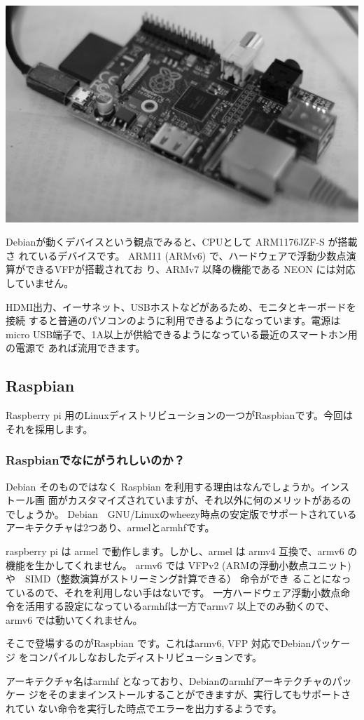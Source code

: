 \documentclass[mingoth,a4paper]{jsarticle}
\begin{document}
\includegraphics[width=0.5\hsize]{image201307/raspberrypi_mono.jpg}

Debianが動くデバイスという観点でみると、CPUとして ARM1176JZF-S が搭載さ
れているデバイスです。
ARM11 (ARMv6) で、ハードウェアで浮動少数点演算ができるVFPが搭載されてお
り、ARMv7 以降の機能である NEON には対応していません。

HDMI出力、イーサネット、USBホストなどがあるため、モニタとキーボードを接続
すると普通のパソコンのように利用できるようになっています。電源はmicro
USB端子で、1A以上が供給できるようになっている最近のスマートホン用の電源で
あれば流用できます。

\subsection{Raspbian}

Raspberry pi 用のLinuxディストリビューションの一つがRaspbianです。今回は
それを採用します。

\subsubsection{Raspbianでなにがうれしいのか？}

Debian そのものではなく Raspbian を利用する理由はなんでしょうか。インストール画
面がカスタマイズされていますが、それ以外に何のメリットがあるのでしょうか。
Debian　GNU/Linuxのwheezy時点の安定版でサポートされているアーキテクチャは2つあり、armelとarmhfです。

raspberry pi は armel で動作します。しかし、armel は armv4 互換で、armv6 の機能を生かしてくれません。
armv6 では VFPv2 (ARMの浮動小数点ユニット) や　SIMD（整数演算がストリーミング計算できる） 命令ができ
ることになっているので、それを利用しない手はないです。
一方ハードウェア浮動小数点命令を活用する設定になっているarmhfは一方でarmv7 以上でのみ動くので、armv6 では動いてくれません。

そこで登場するのがRaspbian です。これはarmv6, VFP 対応でDebianパッケージ
をコンパイルしなおしたディストリビューションです。

アーキテクチャ名はarmhf となっており、Debianのarmhfアーキテクチャのパッケー
ジをそのままインストールすることができますが、実行してもサポートされてい
ない命令を実行した時点でエラーを出力するようです。
\end{document}
